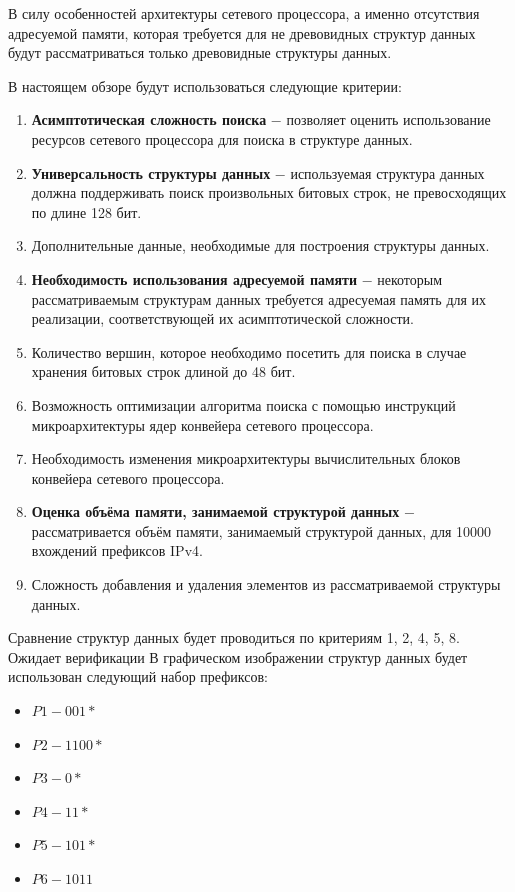 \documentclass[a4peper, 12pt, titlepage, finall]{report}
\begin{document}
        В силу особенностей архитектуры сетевого процессора, а именно отсутствия адресуемой памяти, 
        которая требуется для не древовидных структур данных будут рассматриваться только древовидные структуры данных. 
        
        В настоящем обзоре будут использоваться следующие критерии:
        \begin{enumerate}
            \item {\bf Асимптотическая сложность поиска} $-$ позволяет оценить использование ресурсов сетевого процессора для поиска в структуре данных.
            \item {\bf Универсальность структуры данных} $-$ используемая структура данных должна поддерживать поиск произвольных битовых строк,
                  не превосходящих по длине 128 бит.
            \item Дополнительные данные, необходимые для построения структуры данных.
            \item {\bf Необходимость использования адресуемой памяти} $-$ некоторым рассматриваемым структурам данных требуется адресуемая память для их реализации, соответствующей их асимптотической сложности.
            \item Количество вершин, которое необходимо посетить для поиска в случае хранения битовых строк длиной до 48 бит.
            \item Возможность оптимизации алгоритма поиска с помощью инструкций микроархитектуры ядер конвейера сетевого процессора.
            \item Необходимость изменения микроархитектуры вычислительных блоков конвейера сетевого процессора.
            \item {\bf Оценка объёма памяти, занимаемой структурой данных} $-$ рассматривается объём памяти, занимаемый структурой данных, для 10000 вхождений префиксов IPv4.
            \item Сложность добавления и удаления элементов из рассматриваемой структуры данных.
        \end{enumerate}
        Сравнение структур данных будет проводиться по критериям 1, 2, 4, 5, 8. {\ttfamily Ожидает верификации}
        \newpage
        В графическом изображении структур данных будет использован следующий набор префиксов:
        \begin{itemize}
            \item $P1 - 001*$
            \item $P2 - 1100*$
            \item $P3 - 0*$
            \item $P4 - 11*$
            \item $P5 - 101*$
            \item $P6 - 1011$
        \end{itemize}
\end{document}
